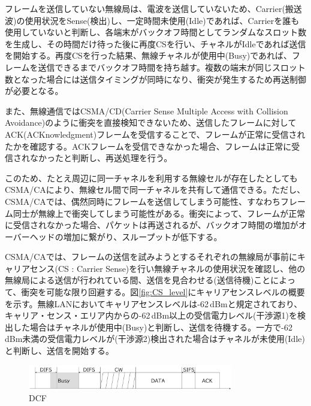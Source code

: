 \documentclass[a4paper,10pt]{ltjsarticle}
\begin{document}
フレームを送信していない無線局は、電波を送信していないため、Carrier(搬送波)の使用状況をSense(検出)し、一定時間未使用(Idle)であれば、Carrierを誰も使用していないと判断し、各端末がバックオフ時間としてランダムなスロット数を生成し、その時間だけ待った後に再度CSを行い、チャネルがIdleであれば送信を開始する。再度CSを行った結果、無線チャネルが使用中(Busy)であれば、フレームを送信できるまでバックオフ時間を持ち越す。複数の端末が同じスロット数となった場合には送信タイミングが同時になり、衝突が発生するため再送制御が必要となる。

また、無線通信ではCSMA/CD(Carrier Sense Multiple Access with Collision Avoidance)のように衝突を直接検知できないため、送信したフレームに対してACK(ACKnowledgment)フレームを受信することで、フレームが正常に受信されたかを確認する。ACKフレームを受信できなかった場合、フレームは正常に受信されなかったと判断し、再送処理を行う。

このため、たとえ周辺に同一チャネルを利用する無線セルが存在したとしてもCSMA/CAにより、無線セル間で同一チャネルを共有して通信できる。ただし、CSMA/CAでは、偶然同時にフレームを送信してしまう可能性、すなわちフレーム同士が無線上で衝突してしまう可能性がある。衝突によって、フレームが正常に受信されなかった場合、パケットは再送されるが、バックオフ時間の増加がオーバーヘッドの増加に繋がり、スループットが低下する。

CSMA/CAでは、フレームの送信を試みようとするそれぞれの無線局が事前にキャリアセンス(CS : Carrier Sense)を行い無線チャネルの使用状況を確認し、他の無線局による送信が行われている間、送信を見合わせる(送信待機)ことによって、衝突を可能な限り回避する。図\ref{fig:CS_level}にキャリアセンスレベルの概要を示す。無線LANにおいてキャリアセンスレベルは-62\,dBmと規定されており、キャリア・センス・エリア内からの-62\,dBm以上の受信電力レベル(干渉源1)を検出した場合はチャネルが使用中(Busy)と判断し、送信を待機する。一方で-62\,dBm未満の受信電力レベルが(干渉源2)検出された場合はチャネルが未使用(Idle)と判断し、送信を開始する。

\begin{figure}[H]
  \centering
  \includegraphics[width=0.8\textwidth]{./assets/DCF.png}
  \caption{DCF}
  \label{fig:DCF}
  
\end{figure}
\end{document}
